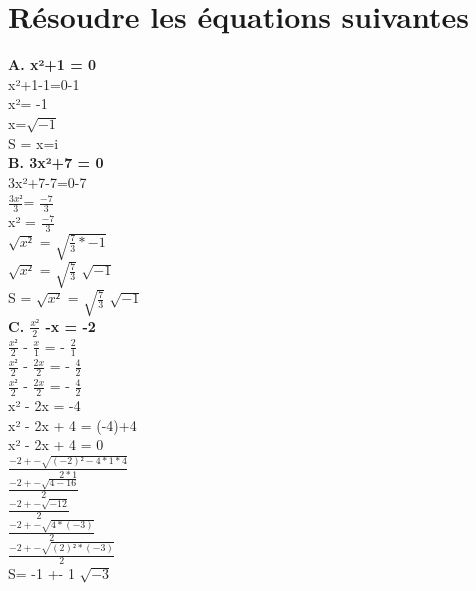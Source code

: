\newpage
\section{Résoudre les équations suivantes}
\vspace{3mm} %

\textbf{A. x²+1 = 0} \\

x²+1-1=0-1 \\
x²= -1 \\
x=$\sqrt{-1}$ \\
S = x=i \\

\vspace{5mm} %
\textbf{B. 3x²+7 = 0} \\

3x²+7-7=0-7 \\

$\frac{3x²}{3}$= $\frac{-7}{3}$ \\

x² = $\frac{-7}{3}$ \\
$\sqrt{x²}$ = $\sqrt{\frac{7}{3} *-1}$ \\
$\sqrt{x²}$ = $\sqrt{\frac{7}{3}}$ $\sqrt{-1}$ \\
S = $\sqrt{x²}$ = $\sqrt{\frac{7}{3}}$ $\sqrt{-1}$ \\

\vspace{5mm} %
\textbf{C. $\frac{x²}{2}$ -x = -2} \\

$\frac{x²}{2}$ - $\frac{x}{1}$ = - $\frac{2}{1}$\\

$\frac{x²}{2}$ - $\frac{2x}{2}$ = - $\frac{4}{2}$\\

$\frac{x²}{2}$ - $\frac{2x}{2}$ = - $\frac{4}{2}$\\

x² - 2x = -4 \\
x² - 2x + 4 = (-4)+4 \\
x² - 2x + 4 = 0 \\

$\frac{-2+-\sqrt{(-2)²-4*1*4}}{2*1}$ \\
$\frac{-2+-\sqrt{4 - 16}}{2}$ \\
$\frac{-2+-\sqrt{-12}}{2}$ \\
$\frac{-2+-\sqrt{4*(-3)}}{2}$ \\
$\frac{-2+-\sqrt{(2)²*(-3)}}{2}$ \\
S= -1 +- 1 $\sqrt{-3}$ \\


